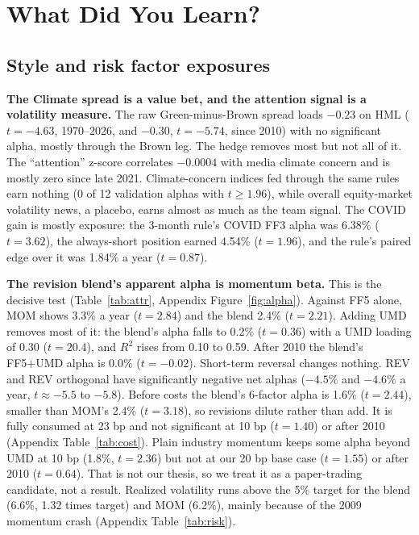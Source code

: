 \documentclass[11pt]{article}
\newcommand{\fit}[1]{\adjustbox{max width=\linewidth}{}}
\begin{document}
\section{What Did You Learn?}
\label{sec:learn}

\subsection{Style and risk factor exposures}
\label{sec:exposures}

\textbf{The Climate spread is a value bet, and the attention signal is a volatility measure.} The raw Green-minus-Brown spread loads $-0.23$ on HML ($t=-4.63$, 1970--2026, and $-0.30$, $t=-5.74$, since 2010) with no significant alpha, mostly through the Brown leg. The hedge removes most but not all of it. The ``attention'' z-score correlates $-0.0004$ with media climate concern \citep{ardia} and is mostly zero since late 2021. Climate-concern indices fed through the same rules earn nothing (0 of 12 validation alphas with $t\geq 1.96$), while overall equity-market volatility news, a placebo, earns almost as much as the team signal. The COVID gain is mostly exposure: the 3-month rule's COVID FF3 alpha was 6.38\% ($t=3.62$), the always-short position earned 4.54\% ($t=1.96$), and the rule's paired edge over it was 1.84\% a year ($t=0.87$).

\begin{table}[h]
\centering\footnotesize
\caption{Revision strategy, net returns (20 bp) regressed on FF5, FF5+UMD (primary) and FF5+UMD+short-term reversal (STREV). Annual alpha in \%, Newey--West (6 lags) $t$ in parentheses. Post-2010 has 192 return months for REV-based books and 199 for MOM.}
\label{tab:attr}
\fit{tables/T5_attribution.tex}
\end{table}

\textbf{The revision blend's apparent alpha is momentum beta.} This is the decisive test (Table~\ref{tab:attr}, Appendix Figure~\ref{fig:alpha}). Against FF5 alone, MOM shows 3.3\% a year ($t=2.84$) and the blend 2.4\% ($t=2.21$). Adding UMD removes most of it: the blend's alpha falls to 0.2\% ($t=0.36$) with a UMD loading of 0.30 ($t=20.4$), and $R^2$ rises from 0.10 to 0.59. After 2010 the blend's FF5+UMD alpha is 0.0\% ($t=-0.02$). Short-term reversal changes nothing. REV and REV orthogonal have significantly negative net alphas ($-4.5\%$ and $-4.6\%$ a year, $t\approx-5.5$ to $-5.8$). Before costs the blend's 6-factor alpha is 1.6\% ($t=2.44$), smaller than MOM's 2.4\% ($t=3.18$), so revisions dilute rather than add. It is fully consumed at 23 bp and not significant at 10 bp ($t=1.40$) or after 2010 (Appendix Table~\ref{tab:cost}). Plain industry momentum keeps some alpha beyond UMD at 10 bp (1.8\%, $t=2.36$) but not at our 20 bp base case ($t=1.55$) or after 2010 ($t=0.64$). That is not our thesis, so we treat it as a paper-trading candidate, not a result. Realized volatility runs above the 5\% target for the blend (6.6\%, 1.32 times target) and MOM (6.2\%), mainly because of the 2009 momentum crash (Appendix Table~\ref{tab:risk}).
\end{document}
